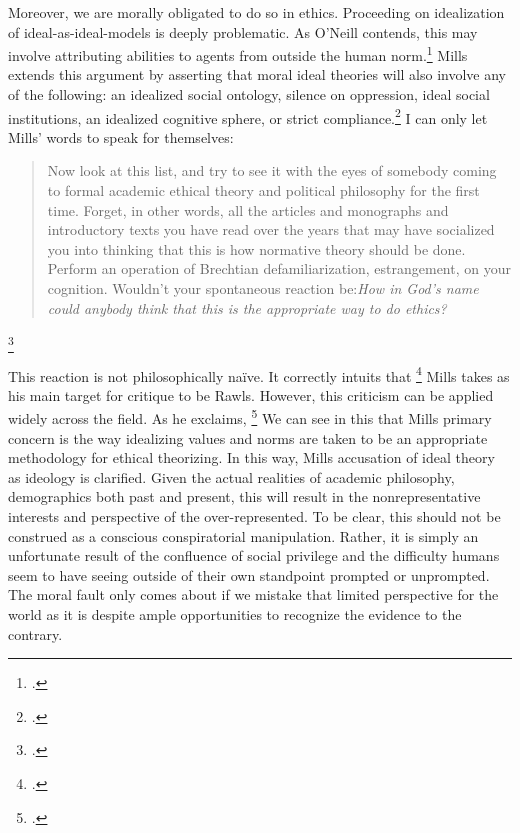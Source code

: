 \documentclass[letterpaper,notitlepage,12pt]{article}
\begin{document}
Moreover, we are morally obligated to do so in ethics.
Proceeding on idealization of ideal-as-ideal-models is deeply problematic.
As O'Neill contends, this may involve attributing abilities to agents from
outside the human norm.\footcite[p. 56]{oneill_abstraction_1987}
Mills extends this argument by asserting that moral ideal theories will also
involve any of the following: an idealized social ontology, silence on
oppression, ideal social institutions, an idealized cognitive sphere, or strict
compliance.\footcite[p. 168-9]{mills_ideal_2005}
I can only let Mills' words to speak for themselves: \blockquote{Now look at
  this list, and try to see it with the eyes of somebody coming to formal
  academic ethical theory and political philosophy for the first time. Forget,
  in other words, all the articles and monographs and introductory texts you
  have read over the years that may have socialized you into thinking that this
  is how normative theory should be done. Perform an operation of Brechtian
  defamiliarization, estrangement, on your cognition. Wouldn't your spontaneous
  reaction be:\textit{How in God's name could anybody think that this is the
appropriate way to do ethics?}}\footcite[p. 169]{mills_ideal_2005}

This reaction is not philosophically na\"{i}ve.
It correctly intuits that \footcite[p.
170]{mills_ideal_2005}
Mills takes as his main target for critique to be Rawls.
However, this criticism can be applied widely across the field.
As he exclaims, \footcite[p. 171]{mills_ideal_2005}
We can see in this that Mills primary concern is the way idealizing values and
norms are taken to be an appropriate methodology for ethical theorizing.
In this way, Mills accusation of ideal theory as ideology is clarified.
Given the actual realities of academic philosophy, demographics both past and
present, this will result in the nonrepresentative interests and perspective of
the over-represented.
To be clear, this should not be construed as a conscious conspiratorial
manipulation.
Rather, it is simply an unfortunate result of the confluence of social
privilege and the difficulty humans seem to have seeing outside of their own
standpoint prompted or unprompted.
The moral fault only comes about if we mistake that limited perspective for the
world as it is despite ample opportunities to recognize the evidence to the
contrary.
\end{document}
